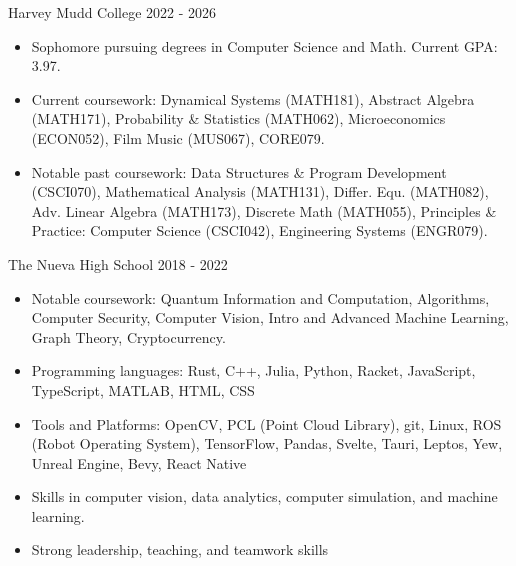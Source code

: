 \documentclass[9pt]{resume}
\begin{document}
    \begin{experiencelist}
        \experiencenocompany 
            {Harvey Mudd College}
            {2022 - 2026}
            {\begin{itemize}[noitemsep, topsep=1pt]
                \item {Sophomore pursuing degrees in Computer Science and Math. Current GPA: 3.97. }
                \item {Current coursework: Dynamical Systems (MATH181), Abstract Algebra (MATH171), Probability \& Statistics (MATH062), Microeconomics (ECON052), Film Music (MUS067), CORE079.}
                \item {Notable past coursework: Data Structures \& Program Development (CSCI070), Mathematical Analysis (MATH131), Differ. Equ. (MATH082), Adv. Linear Algebra (MATH173), Discrete Math (MATH055), Principles \& Practice: Computer Science (CSCI042), Engineering Systems (ENGR079).}
            \end{itemize}}
        \experiencenocompany
            {The Nueva High School}
            {2018 - 2022}
            {\begin{itemize}[noitemsep, topsep=1pt]
                \item Notable coursework: Quantum Information and Computation, Algorithms, Computer Security, Computer Vision, Intro and Advanced Machine Learning, Graph Theory, Cryptocurrency.
            \end{itemize}}
    \end{experiencelist}
    \vspace{-0.2cm}
    \begin{itemize}[noitemsep, topsep=0pt]
        \item Programming languages: Rust, C++, Julia, Python, Racket, JavaScript, TypeScript, MATLAB, HTML, CSS
        \item Tools and Platforms: OpenCV, PCL (Point Cloud Library), git, Linux, ROS (Robot Operating System), TensorFlow, Pandas, Svelte, Tauri, Leptos, Yew, Unreal Engine, Bevy, React Native
        \item Skills in computer vision, data analytics, computer simulation, and machine learning.
        \item Strong leadership, teaching, and teamwork skills
    \end{itemize}
\end{document}
